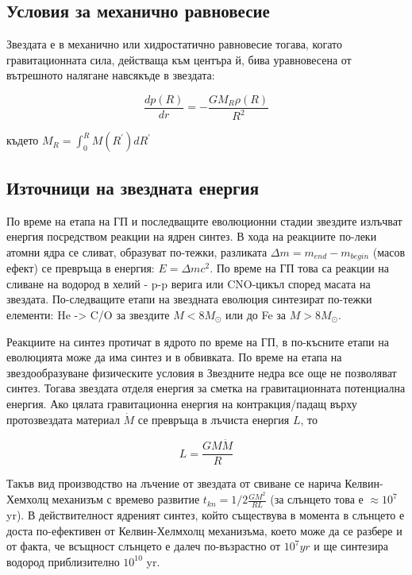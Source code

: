 \documentclass[a4paper,12pt]{article}
\begin{document}
\subsection{Условия за механично равновесие}

 Звездата е в механично или хидростатично равновесие тогава, когато гравитационната сила, действаща към центъра й, бива уравновесена от вътрешното налягане навсякъде в звездата:

\begin{equation}
\frac{dp(R)} {dr} = -\frac{GM_R \rho(R)} {R^2}
\end{equation}

където $M_R = \int_0^R M(R^{'})dR^{'}$



\subsection{Източници на звездната енергия}

По време на етапа на ГП и последващите еволюционни стадии звездите излъчват енергия посредством реакции на ядрен синтез. В хода на реакциите по-леки атомни ядра се сливат, образуват по-тежки, разликата $\Delta m = m_{end} - m_{begin}$ (масов ефект)  се превръща в енергия: $E=\Delta m c^2$. По време на ГП това са реакции на сливане на водород в хелий - p-p верига или CNO-цикъл според масата на звездата. По-следващите етапи на звездната еволюция синтезират по-тежки елементи: He -> C/O за звездите $M<8M_{\odot}$ или до Fe за $M>8M_{\odot}$.

 Реакциите на синтез протичат в ядрото по време на ГП, в по-късните етапи на еволюцията може да има синтез и в обвивката. По време на етапа на звездообразуване физическите условия в Звездните недра все още не позволяват синтез. Тогава звездата отделя енергия за сметка на гравитационната потенциална енергия. Ако цялата гравитационна енергия на контракция/падащ върху протозвездата материал $\dot{M}$ се превръща в лъчиста енергия $L$, то

\begin{equation}
L=\frac{GM\dot{M}} {R}
\end{equation}

Такъв вид производство на лъчение от звездата от свиване се нарича Келвин-Хемхолц механизъм с времево развитие $t_{kn}=1/2 \frac{GM^2} {RL}$ (за слънцето това е $\approx 10^7$ yr). В действителност ядреният синтез, който съществува в момента в слънцето е доста по-ефективен от Келвин-Хелмхолц механизъма, което може да се разбере и от факта, че всъщност слънцето е далеч по-възрастно от $10^7yr$ и ще синтезира водород приблизително $10^{10}$ yr.
\end{document}
